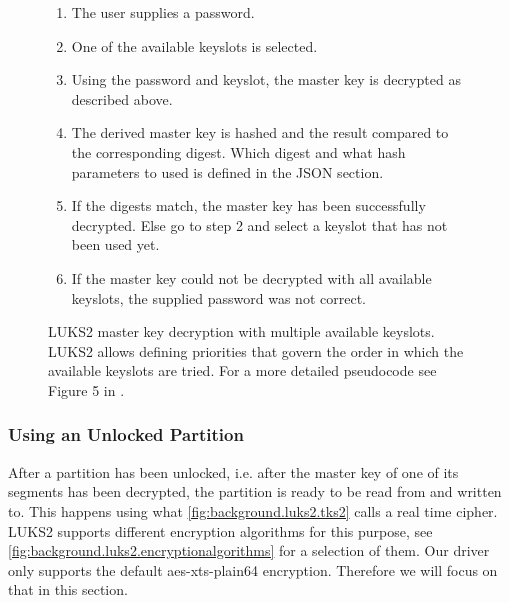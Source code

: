 \begin{figure}[htb!]
	\center
	\begin{mdframed}
		\begin{enumerate}
			\item The user supplies a password.
			\item One of the available keyslots is selected.
			\item Using the password and keyslot, the master key is decrypted as described above.
			\item The derived master key is hashed and the result compared to the corresponding digest. Which digest and what hash parameters to used is defined in the JSON section.
			\item If the digests match, the master key has been successfully decrypted. Else go to step 2 and select a keyslot that has not been used yet.
			\item If the master key could not be decrypted with all available keyslots, the supplied password was not correct.
		\end{enumerate}
	\end{mdframed}
	\caption[
		LUKS2 master key decryption with multiple available keyslots
	]{
		LUKS2 master key decryption with multiple available keyslots. LUKS2 allows defining priorities that govern the order in which the available keyslots are tried. For a more detailed pseudocode see Figure 5 in \cite{Fruwirth2018}.
	}
	\label{fig:background.luks2.unlocking}
\end{figure}

\subsubsection{Using an Unlocked Partition}
\label{chap:background.luks2.using}
After a partition has been unlocked, i.e. after the master key of one of its segments has been decrypted, the partition is ready to be read from and written to. This happens using what \autoref{fig:background.luks2.tks2} calls a real time cipher. LUKS2 supports different encryption algorithms for this purpose, see \autoref{fig:background.luks2.encryptionalgorithms} for a selection of them. Our driver only supports the default aes-xts-plain64 encryption. Therefore we will focus on that in this section.

